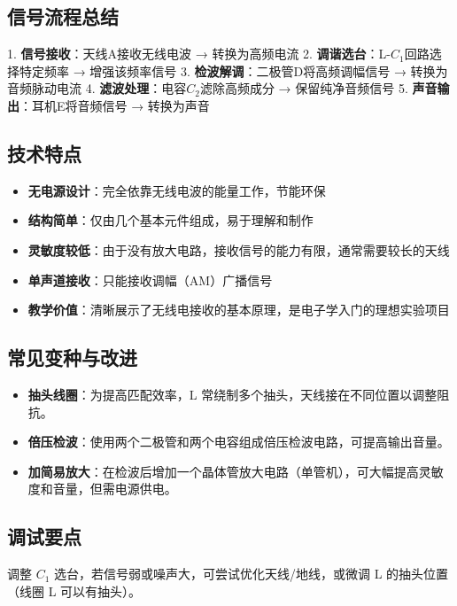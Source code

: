 \documentclass[12pt,UTF8]{ctexbook}
\begin{document}
\subsection{信号流程总结}

1. \textbf{信号接收}：天线A接收无线电波 → 转换为高频电流
2. \textbf{调谐选台}：L-$C_1$回路选择特定频率 → 增强该频率信号
3. \textbf{检波解调}：二极管D将高频调幅信号 → 转换为音频脉动电流
4. \textbf{滤波处理}：电容$C_2$滤除高频成分 → 保留纯净音频信号
5. \textbf{声音输出}：耳机E将音频信号 → 转换为声音

\subsection{技术特点}

\begin{itemize}
  \item \textbf{无电源设计}：完全依靠无线电波的能量工作，节能环保
  \item \textbf{结构简单}：仅由几个基本元件组成，易于理解和制作
  \item \textbf{灵敏度较低}：由于没有放大电路，接收信号的能力有限，通常需要较长的天线
  \item \textbf{单声道接收}：只能接收调幅（AM）广播信号
  \item \textbf{教学价值}：清晰展示了无线电接收的基本原理，是电子学入门的理想实验项目
\end{itemize}





\subsection{常见变种与改进}

\begin{itemize}
  \item \textbf{抽头线圈}：为提高匹配效率，L 常绕制多个抽头，天线接在不同位置以调整阻抗。
  \item \textbf{倍压检波}：使用两个二极管和两个电容组成倍压检波电路，可提高输出音量。
  \item \textbf{加简易放大}：在检波后增加一个晶体管放大电路（单管机），可大幅提高灵敏度和音量，但需电源供电。
\end{itemize}

\subsection{调试要点}

调整 $C_1$ 选台，若信号弱或噪声大，可尝试优化天线/地线，或微调 L 的抽头位置（线圈 L 可以有抽头）。
\end{document}
